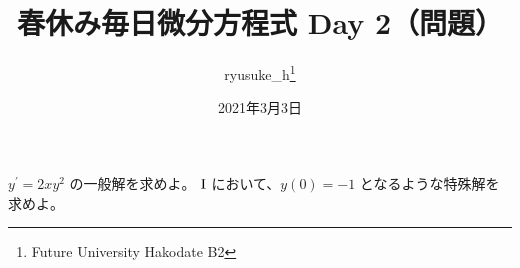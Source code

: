 \documentclass[a4j]{jsarticle}
\title{春休み毎日微分方程式 Day 2（問題）}
\author{ryusuke\_h\thanks{Future University Hakodate B2}}
\date{2021年3月3日}
\begin{document}
\maketitle

\begin{qparts}
    \qpart $ y ^ {\prime} = 2xy ^ 2 $ の一般解を求めよ。
    \qpart $\rm I$ において、$ y(0) = -1 $ となるような特殊解を求めよ。
\end{qparts}
\end{document}
